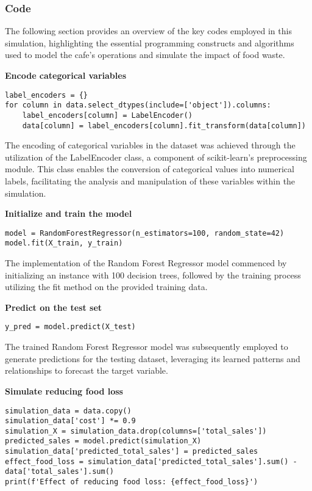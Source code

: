 \subsubsection{ Code }

The following section provides an overview of the key codes employed in this simulation, highlighting the essential programming constructs and algorithms used to model the cafe's operations and simulate the impact of food waste.

\textbf{Encode categorical variables}

\begin{lstlisting}
label_encoders = {}
for column in data.select_dtypes(include=['object']).columns:
    label_encoders[column] = LabelEncoder()
    data[column] = label_encoders[column].fit_transform(data[column])
\end{lstlisting}

The encoding of categorical variables in the dataset was achieved through the utilization of the LabelEncoder class, a component of scikit-learn's preprocessing module. This class enables the conversion of categorical values into numerical labels, facilitating the analysis and manipulation of these variables within the simulation.

\textbf{Initialize and train the model}

\begin{lstlisting}
model = RandomForestRegressor(n_estimators=100, random_state=42)
model.fit(X_train, y_train)
\end{lstlisting}

The implementation of the Random Forest Regressor model commenced by initializing an instance with 100 decision trees, followed by the training process utilizing the fit method on the provided training data.

\textbf{Predict on the test set}

\begin{lstlisting}
y_pred = model.predict(X_test)
\end{lstlisting}

The trained Random Forest Regressor model was subsequently employed to generate predictions for the testing dataset, leveraging its learned patterns and relationships to forecast the target variable.

\textbf{Simulate reducing food loss}

\begin{lstlisting}
simulation_data = data.copy()
simulation_data['cost'] *= 0.9
simulation_X = simulation_data.drop(columns=['total_sales'])
predicted_sales = model.predict(simulation_X)
simulation_data['predicted_total_sales'] = predicted_sales
effect_food_loss = simulation_data['predicted_total_sales'].sum() - data['total_sales'].sum()
print(f'Effect of reducing food loss: {effect_food_loss}')
\end{lstlisting}

